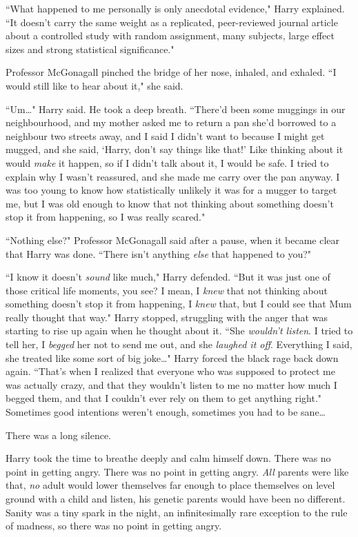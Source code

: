 ``What happened to me personally is only anecdotal evidence," Harry explained. ``It doesn't carry the same weight as a replicated, peer-reviewed journal article about a controlled study with random assignment, many subjects, large effect sizes and strong statistical significance."

Professor McGonagall pinched the bridge of her nose, inhaled, and exhaled. ``I would still like to hear about it," she said.

``Um{\ldots}" Harry said. He took a deep breath. ``There'd been some muggings in our neighbourhood, and my mother asked me to return a pan she'd borrowed to a neighbour two streets away, and I said I didn't want to because I might get mugged, and she said, `Harry, don't say things like that!' Like thinking about it would \emph{make} it happen, so if I didn't talk about it, I would be safe. I tried to explain why I wasn't reassured, and she made me carry over the pan anyway. I was too young to know how statistically unlikely it was for a mugger to target me, but I was old enough to know that not thinking about something doesn't stop it from happening, so I was really scared."

``Nothing else?" Professor McGonagall said after a pause, when it became clear that Harry was done. ``There isn't anything \emph{else} that happened to you?"

``I know it doesn't \emph{sound} like much," Harry defended. ``But it was just one of those critical life moments, you see? I mean, I \emph{knew} that not thinking about something doesn't stop it from happening, I \emph{knew} that, but I could see that Mum really thought that way." Harry stopped, struggling with the anger that was starting to rise up again when he thought about it. ``She \emph{wouldn't listen}. I tried to tell her, I \emph{begged} her not to send me out, and she \emph{laughed it off}. Everything I said, she treated like some sort of big joke{\ldots}" Harry forced the black rage back down again. ``That's when I realized that everyone who was supposed to protect me was actually crazy, and that they wouldn't listen to me no matter how much I begged them, and that I couldn't ever rely on them to get anything right." Sometimes good intentions weren't enough, sometimes you had to be sane{\ldots}

There was a long silence.

Harry took the time to breathe deeply and calm himself down. There was no point in getting angry. There was no point in getting angry. \emph{All} parents were like that, \emph{no} adult would lower themselves far enough to place themselves on level ground with a child and listen, his genetic parents would have been no different. Sanity was a tiny spark in the night, an infinitesimally rare exception to the rule of madness, so there was no point in getting angry.

